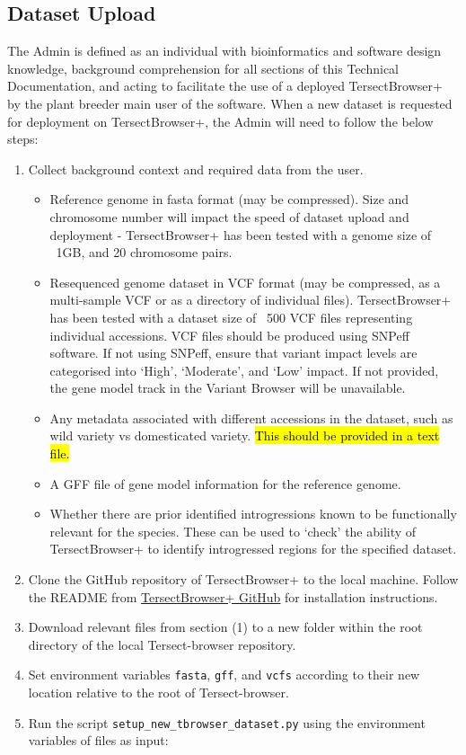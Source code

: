 \documentclass[12pt]{article}
\begin{document}
\subsection{Dataset Upload}

The Admin is defined as an individual with bioinformatics and software design knowledge, background comprehension for all sections of this Technical Documentation, and acting to facilitate the use of a deployed TersectBrowser+ by the plant breeder main user of the software. When a new dataset is requested for deployment on TersectBrowser+, the Admin will need to follow the below steps:
\begin{enumerate}
    \item Collect background context and required data from the user.
\begin{itemize}
    \item Reference genome in fasta format (may be compressed). Size and chromosome number will impact the speed of dataset upload and deployment - TersectBrowser+ has been tested with a genome size of ~1GB, and 20 chromosome pairs.
    \item Resequenced genome dataset in VCF format (may be compressed, as a multi-sample VCF or as a directory of individual files). TersectBrowser+ has been tested with a dataset size of ~500 VCF files representing individual accessions. VCF files should be produced using SNPeff software. If not using SNPeff, ensure that variant impact levels are categorised into `High', `Moderate', and `Low' impact. If not provided, the gene model track in the Variant Browser will be unavailable. 
    \item Any metadata associated with different accessions in the dataset, such as wild variety vs domesticated variety. \hl{This should be provided in a text file.}
    \item A GFF file of gene model information for the reference genome. 
    \item Whether there are prior identified introgressions known to be functionally relevant for the species. These can be used to `check' the ability of TersectBrowser+ to identify introgressed regions for the specified dataset.
\end{itemize}
    \item Clone the GitHub repository of TersectBrowser+ to the local machine. Follow the README from \hyperlink {https://github.com/Tersect-Browser/Tersect-browser.git}{TersectBrowser+ GitHub} for installation instructions.
    \item Download relevant files from section (1) to a new folder within the root directory of the local Tersect-browser repository.
    \item Set environment variables \verb+fasta+, \verb+gff+, and \verb+vcfs+ according to their new location relative to the root of Tersect-browser.
    \item Run the script \verb+setup_new_tbrowser_dataset.py+ using the environment variables of files as input:
    

\end{enumerate}
\end{document}
